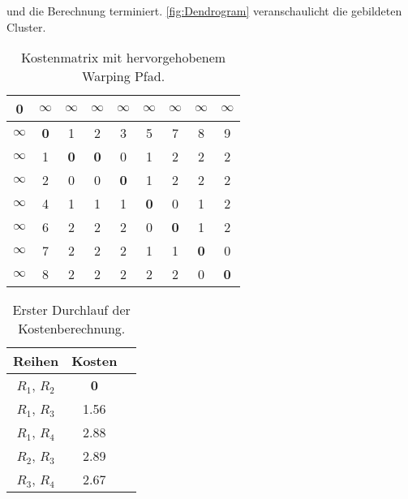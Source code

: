 und die Berechnung terminiert.
\autoref{fig:Dendrogram} veranschaulicht die gebildeten Cluster.
\begin{table}[ht]
    \begin{center}
        \begin{tabular}{ |c||c|c|c|c|c|c|c|c| } 
         \hline
         \textbf{0} & $\infty$ & $\infty$ & $\infty$
         & $\infty$ & $\infty$ & $\infty$ & $\infty$ & $\infty$ \\
         \hline
         \hline
         $\infty$ &\textbf{0} & 1 & 2 & 3 & 5 & 7 & 8 & 9 \\
         \hline
         $\infty$ & 1 & \textbf{0} & \textbf{0} & 0 & 1 & 2 & 2 & 2 \\
         \hline
         $\infty$ & 2 & 0 & 0 & \textbf{0} & 1 & 2 & 2 & 2 \\
         \hline
         $\infty$ & 4 & 1 & 1 & 1 & \textbf{0} & 0 & 1 & 2 \\
         \hline
         $\infty$ & 6 & 2 & 2 & 2 & 0 & \textbf{0} & 1 & 2 \\
         \hline
         $\infty$ & 7 & 2 & 2 & 2 & 1 & 1 & \textbf{0} & 0 \\
         \hline
         $\infty$ & 8 & 2 & 2 & 2 & 2 & 2 & 0 & \textbf{0} \\
         \hline
        \end{tabular}
        \caption{Kostenmatrix mit hervorgehobenem Warping Pfad.}
        \label{tbl:ExampleMatrix}
    \end{center}
\end{table}
\begin{table}[ht]
    \begin{center}
        \begin{tabular}{ |c|c|c| } 
         \hline
         Reihen & Kosten \\
         \hline \hline
         $R_{1}$, $R_{2}$ & \textbf{0} \\
         \hline
         $R_{1}$, $R_{3}$ & 1.56 \\
         \hline
         $R_{1}$, $R_{4}$ & 2.88 \\
         \hline
         $R_{2}$, $R_{3}$ & 2.89 \\
         \hline
         $R_{3}$, $R_{4}$ & 2.67 \\
         \hline
        \end{tabular}
        \caption{Erster Durchlauf der Kostenberechnung.}
        \label{tbl:ExampleCost1}
    \end{center}
\end{table}
